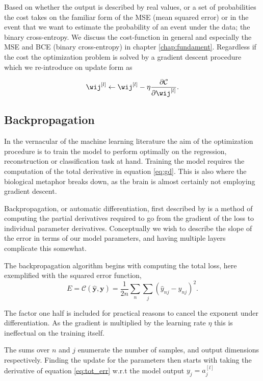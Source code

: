 Based on whether the output is described by real values, or a set of probabilities the cost takes on the familiar form of the MSE (mean squared error) or in the event that we want to estimate the probability of an event under the data; the binary cross-entropy. We discuss the cost-function in general and especially the MSE and BCE (binary cross-entropy) in chapter \ref{chap:fundament}. Regardless if the cost the optimization problem is solved by a gradient descent procedure which we re-introduce on update form as 

\begin{equation}\label{eq:gd}
	\wij^{[l]} \leftarrow \wij^{[l]} -\eta \frac{\partial \mathcal{C}}{\partial \wij^{[l]}} .
\end{equation}

\subsection{Backpropagation}\label{sec:backpropagation}

In the vernacular of the machine learning literature the aim of the optimization procedure is to train the model to perform optimally on the regression, reconstruction or classification task at hand. Training the model requires the computation of the total derivative in equation \ref{eq:gd}. This is also where the biological metaphor breaks down, as the brain is almost certainly not employing gradient descent.

Backpropagation, or automatic differentiation, first described by \citet{Linnainmaa1976} is a method of computing the partial derivatives required to go from the gradient of the loss to individual parameter derivatives. Conceptually we wish to describe the slope of the error in terms of our model parameters, and having multiple layers complicate this somewhat. 

The backpropagation algorithm begins with computing the total loss, here exemplified with the squared error function,
\begin{equation}\label{eq:tot_err}
	E = \mathcal{C}(\mathbf{\hat{y}}, \mathbf{y}) = \frac{1}{2n}\sum_n \sum_j (\hat{y}_{nj}-y_{nj} )^2.
\end{equation}

\noindent The factor one half is included for practical reasons to cancel the exponent under differentiation. As the gradient is multiplied by the learning rate $\eta$ this is ineffectual on the training itself. 

The sums over $n$ and $j$ enumerate the number of samples, and output dimensions respectively. Finding the update for the parameters then starts with taking the derivative of equation \ref{eq:tot_err} w.r.t the model output $y_j  = a^{[l]}_j$


